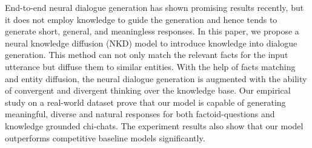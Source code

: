End-to-end neural dialogue generation has shown promising results recently, but it does not employ knowledge to guide the generation and hence tends to generate short, general, and meaningless responses. In this paper, we propose a neural knowledge diffusion (NKD) model to introduce knowledge into dialogue generation. This method can not only match the relevant facts for the input utterance but diffuse them to similar entities. With the help of facts matching and entity diffusion, the neural dialogue generation is augmented with the ability of convergent and divergent thinking over the knowledge base. Our empirical study on a real-world dataset prove that our model is capable of generating meaningful, diverse and natural responses for both factoid-questions and knowledge grounded chi-chats. The experiment results also show that our model outperforms competitive baseline models significantly.
